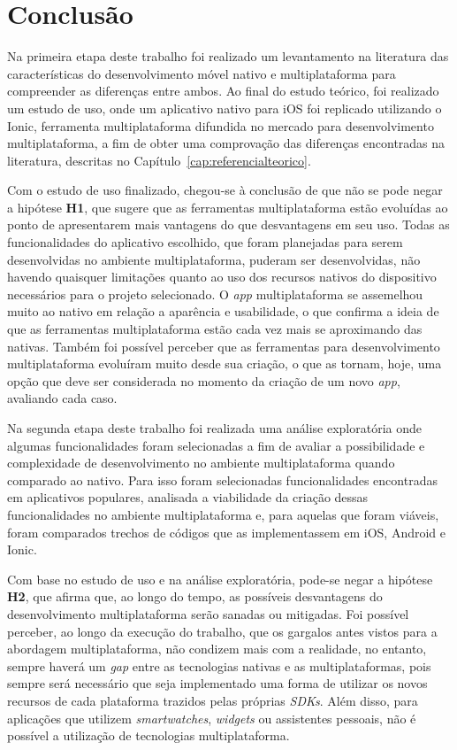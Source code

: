 \chapter{Conclusão} \label{cap:consideracoespreliminares}
Na primeira etapa deste trabalho foi realizado um levantamento na literatura das características do desenvolvimento móvel nativo e multiplataforma para compreender as diferenças entre ambos. Ao final do estudo teórico, foi 
realizado um estudo de uso, onde um aplicativo nativo para iOS foi replicado utilizando o Ionic, ferramenta multiplataforma difundida 
no mercado para desenvolvimento multiplataforma, a fim de obter uma comprovação das diferenças encontradas na literatura, descritas no Capítulo~\ref{cap:referencialteorico}.

Com o estudo de uso finalizado, chegou-se à conclusão de que não se pode negar a hipótese \textbf{H1}, que sugere que as ferramentas multiplataforma estão evoluídas ao ponto de apresentarem mais vantagens do que 
desvantagens em seu uso.
Todas as funcionalidades do aplicativo escolhido, que foram planejadas para serem desenvolvidas no ambiente multiplataforma, puderam ser desenvolvidas, não havendo quaisquer limitações quanto ao uso dos 
recursos nativos do dispositivo necessários para o projeto selecionado. O \textit{app} multiplataforma se assemelhou muito ao nativo em relação a aparência e usabilidade, o que confirma a ideia de que as ferramentas 
multiplataforma estão cada vez mais se aproximando das nativas. Também foi possível perceber que as ferramentas para desenvolvimento multiplataforma evoluíram muito desde sua criação, o que as tornam, hoje, uma 
opção que deve ser considerada no momento da criação de um novo \textit{app}, avaliando cada caso.

Na segunda etapa deste trabalho foi realizada uma análise exploratória onde algumas funcionalidades foram selecionadas a fim de avaliar a possibilidade e complexidade de desenvolvimento no ambiente 
multiplataforma quando comparado ao nativo. Para isso foram selecionadas funcionalidades encontradas em aplicativos populares, analisada a viabilidade da criação dessas funcionalidades no ambiente multiplataforma e, 
para aquelas que foram viáveis, foram comparados trechos de códigos que as implementassem em iOS, Android e Ionic. 

Com base no estudo de uso e na análise exploratória, pode-se negar a hipótese \textbf{H2}, que afirma que, ao longo do tempo, as possíveis desvantagens do desenvolvimento multiplataforma serão sanadas ou mitigadas. 
Foi possível perceber, ao longo da execução do trabalho, que os gargalos antes vistos para a abordagem multiplataforma, não condizem mais com a realidade, no entanto, sempre haverá um \textit{gap} entre as tecnologias 
nativas e as multiplataformas, pois sempre será necessário que seja implementado uma forma de utilizar os novos recursos de cada plataforma trazidos pelas próprias \textit{SDKs}. Além disso, para aplicações que utilizem 
\textit{smartwatches}, \textit{widgets} ou assistentes pessoais, não é possível a utilização de tecnologias multiplataforma.

